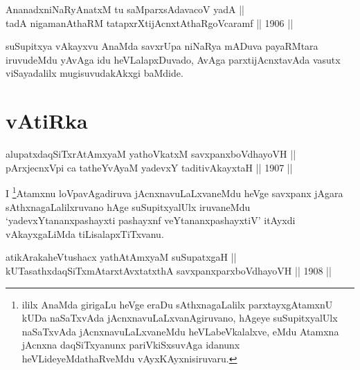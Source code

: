 \begin{shl}
\footnotemark[2]AnanadxniNaRyAnatxM tu saMparxsAdavacoV yadA || \\
tadA nigamanAthaRM tatapxrXtijAcnxtAthaRgoVcaramf ||  1906 ||  
\end{shl}

\begin{artha}
suSupitxya vAkayxvu AnaMda savxrUpa
niNaRya mADuva payaRMtara iruvudeMdu yAvAga idu heVLalapxDuvado, AvAga
parxtijAcnxtavAda vasutx viSayadalilx mugisuvudakAkxgi baMdide.
\end{artha}

\section*{vAtiRka}


\begin{shl}
alupatxdaqSiTxrAtAmx\s yaM yathoVkatxM savxpanxboVdhayoVH || \\
pArxjecnxV\s pi ca tatheYvAyaM yadevxY taditivAkayxtaH ||  1907 ||  
\end{shl}

\begin{artha}
I \footnote[1]{ililx AnaMda girigaLu heVge eraDu sAthxnagaLalilx
parxtayxgAtamxnU kUDa naSaTxvAda jAcnxnavuLaLxvanAgiruvano, hAgeye
suSupitxyalUlx naSaTxvAda jAcnxnavuLaLxvaneMdu heVLabeVkalalxve,
eMdu Atamxna jAcnxna daqSiTxyanunx pariVkiSxsuvAga idanunx
heVLideyeMdathaRveMdu vAyxKAyxnisiruvaru.}Atamxnu loVpavAgadiruva jAcnxnavuLaLxvaneMdu heVge
savxpanx jAgara sAthxnagaLalilxruvano hAge suSupitxyalUlx iruvaneMdu
`yadevxYtananxpashayxti pashayxnf veYtananxpashayxtiV' itAyxdi vAkayxgaLiMda tiLisalapxTiTxvanu.
\end{artha}


\begin{shl}
atikArakaheVtushacx yathA\s \s tAmx\s yaM suSupatxgaH || \\
kUTasathxdaqSiTxmAtarxtAvxtatxthA savxpanxparxboVdhayoVH ||  1908 ||  
\end{shl}

